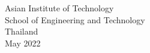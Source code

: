 \begin{titlepage}
\begin{center}
    \vspace{4em}

    Asian Institute of Technology \\
    School of Engineering and Technology \\
    Thailand \\
    May 2022


  \end{center}
\end{titlepage}
